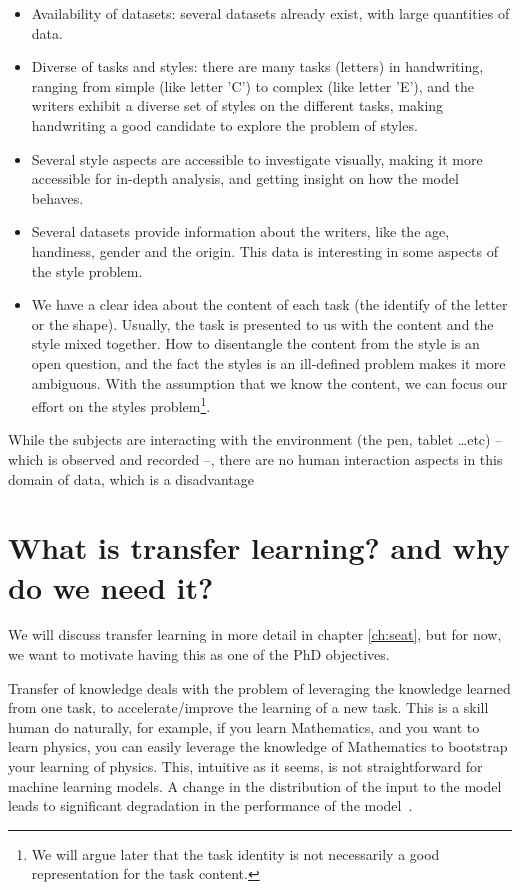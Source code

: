   \begin{itemize}
    \item Availability of datasets: several datasets already exist, with large quantities of data.
    \item Diverse of tasks and styles: there are many tasks (letters) in handwriting, ranging from simple (like letter 'C') to complex (like letter 'E'), and the writers exhibit a diverse set of styles on the different tasks, making handwriting a good candidate to explore the problem of styles.
    \item Several style aspects are accessible to investigate visually, making it more accessible for in-depth analysis, and getting insight on how the model behaves.
    \item Several datasets provide information about the writers, like the age, handiness, gender and the origin. This data is interesting in some aspects of the style problem.
    \item We have a clear idea about the content of each task (the identify of the letter or the shape). Usually, the task is presented to us with the content and the style mixed together. How to disentangle the content from the style is an open question, and the fact the styles is an ill-defined problem makes it more ambiguous. With the assumption that we know the content, we can focus our effort on the styles problem\footnote{We will argue later that the task identity is not necessarily a good representation for the task content.}.
  \end{itemize}
  While the subjects are interacting with the environment (the pen, tablet \dots etc) -- which is observed and recorded --, there are no human interaction aspects in this domain of data, which is a disadvantage

\section{What is transfer learning? and why do we need it?}
\par We will discuss transfer learning in more detail in chapter \ref{ch:seat}, but for now, we want to motivate having this as one of the PhD objectives.

\par Transfer of knowledge deals with the problem of leveraging the knowledge learned from one task, to accelerate/improve the learning of a new task. This is a skill human do naturally, for example, if you learn Mathematics, and you want to learn physics, you can easily leverage the knowledge of Mathematics to bootstrap your learning of physics. This, intuitive as it seems, is not straightforward for machine learning models. A change in the distribution of the input to the model leads to significant degradation in the performance of the model~\citep{shimodaira2000improving}.

